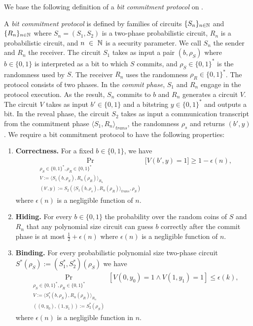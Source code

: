 We base the following definition of a \textit{bit commitment protocol} on \cite{LectureNotesComThCrypto}.
\begin{definition}
  \label{def:bit_commitment}
A \textit{bit commitment protocol} is defined by families of circuits $\{S_n\}_{n \in \mathbb{N}}$ and $\{R_n\}_{n \in \mathbb{N}}$
where $S_n = (S_1, S_2)$ is a two-phase probabilistic circuit, $R_n$ is a probabilistic circuit, and
$n~\in~\mathbb{N}$ is a security parameter. We call $S_n$ the sender and $R_n$ the receiver.
The circuit $S_1$ takes as input a pair $(b, \rho_S)$ where $b \in \{0,1\}$ is interpreted as a bit to which $S$ commits, and $\rho_S \in \{0,1\}^{*}$ is the randomness used by $S$.
The receiver $R_n$ uses the randomness $\rho_R \in \{0,1\}^{*}$.
The protocol consists of two phases. In the \textit{commit phase}, $S_1$ and $R_n$ engage in the protocol execution.
As the result, $S_n$ commits to $b$ and $R_n$ generates a circuit $V$.
The circuit $V$ takes as input $b' \in \{0,1\}$ and a bitstring $y \in \{0,1\}^{*}$ and outputs a bit.
In the \textnormal{reveal phase}, the circuit $S_2$ takes as input a communication transcript from the commitment phase
$\langle S_1, R_n \rangle_{\mathit{trans}}$, the randomness $\rho_s$ and returns $(b', y)$.
We require a bit commitment protocol to have the following properties:
\begin{enumerate}[]
\item{\textnormal{\textbf{Correctness.}}} For a fixed $b \in \{0,1\}$, we have
  \begin{align*}
    \underset{\substack{\rho_S \in \{0,1\}^{*}, \rho_R \in \{0,1\}^{*} \\
        V := \langle S_1(b,\rho_S), R_n(\rho_R) \rangle_{R_n} \\
        (b',y) := S_2(\langle S_1(b,\rho_s), R_n(\rho_R) \rangle_{\mathit{trans}},\rho_S)}}{\Pr}\Big[V(b',y) = 1 \Big] \geq 1 - \epsilon(n),
  \end{align*}
where $\epsilon(n)$ is a negligible function of $n$.
\item{\textnormal{\textbf{Hiding.}}}
  For every $b \in \{0,1\}$ the probability over the random coins of $S$ and $R_n$ that any polynomial size circuit
  can guess $b$ correctly after the commit phase is at most $\frac{1}{2} + \epsilon(n)$ where $\epsilon(n)$ is a negligible function of $n$.
\item{\textnormal{\textbf{Binding.}}}
  For every probabilistic polynomial size two-phase circuit $S^*(\rho_S) := (S^*_1, S^*_2)(\rho_S)$ we have
  \begin{align*}
    \underset{\substack{
        \rho_S \in \{0,1\}^{*}, \rho_R \in \{0,1\}^{*} \\
        V := \langle S_1^*(b,\rho_S), R_n(\rho_R) \rangle_{R_n} \\ ((0, y_0), (1, y_1)) := S_2^*(\rho_S)}}{\Pr}[V(0,y_0) = 1 \land V(1,y_1) = 1] \leq \epsilon(k),
  \end{align*}
  where $\epsilon(n)$ is a negligible function in $n$.
\end{enumerate}
\end{definition}

